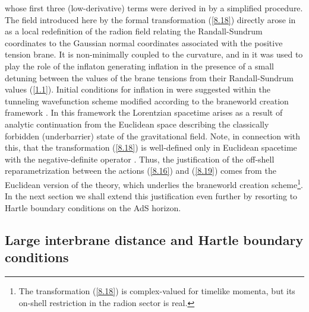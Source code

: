 \documentclass[a4paper,preprint,nofootinbib,
                 showpacs,preprintnumbers,amsmath,amssymb]{revtex4}
\begin{document}
whose first three (low-derivative) terms were derived in  
\cite{brane} by a simplified procedure. 
The field \myHighlight{$\varphi$}\coordHE{} introduced here by the formal transformation 
(\ref{8.18}) directly arose in \cite{brane} as a local redefinition  
of the radion field relating the Randall-Sundrum coordinates to the 
Gaussian normal coordinates associated with the positive tension 
brane. It is non-minimally coupled to the curvature, and in 
\cite{brane} it was used to play the role of the inflaton 
generating inflation in the presence of a small detuning between the 
values of the brane tensions \myHighlight{$\sigma_\pm$}\coordHE{} from their Randall-Sundrum 
values (\ref{1.1}). Initial conditions for inflation in 
\cite{brane} were suggested within the tunneling wavefunction 
scheme \cite{tun} modified according to the braneworld creation 
framework \cite{GarSas,HHR1,HHR2}. In this framework the 
Lorentzian spacetime arises as a result of analytic continuation 
from the Euclidean space describing the classically forbidden 
(underbarrier) state of the gravitational field. Note, in 
connection with this, that the transformation (\ref{8.18}) is 
well-defined only in Euclidean spacetime with the 
negative-definite operator \myHighlight{$\Box$}\coordHE{}. Thus, the justification of the 
off-shell reparametrization between the actions (\ref{8.16}) and 
(\ref{8.19}) comes from the Euclidean version of the theory, which 
underlies the braneworld creation scheme\footnote{The 
transformation (\ref{8.18}) is complex-valued for timelike 
momenta, but its on-shell restriction in the radion sector is 
real.}. In the next section we shall extend this justification 
even further by resorting to Hartle boundary conditions on the AdS 
horizon. 
 
\subsection{Large interbrane distance and Hartle boundary conditions 
\label{hartle}} 
 
\end{document}
